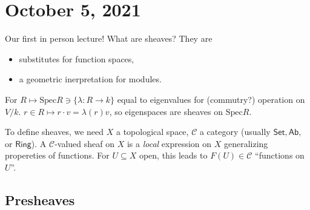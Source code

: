\section{October 5, 2021} 
Our first in person lecture! What are sheaves? They are 
\begin{itemize}
\setlength\itemsep{-.2em}
    \item substitutes for function spaces,
    \item a geometric inerpretation for modules.
\end{itemize}
For $R \mapsto \mathrm{Spec}R \ni \{\lambda \colon R \to k\} $ equal to  eigenvalues for (commutry?) operation on $V / k$. $r \in R \mapsto  r \cdot v = \lambda(r) v$, so eigenspaces are sheaves on $\mathrm{Spec}R$.

To define sheaves, we need $X$ a topological space, $\mathcal{C} $ a category (usually $\mathsf{Set} , \mathsf{Ab} , $ or $\mathsf{Ring} $). A $\mathcal{C} $-valued sheaf on $X$ is a \emph{local} expression on $X$ generalizing propereties of functions. For $U \subseteq X$ open, this leads to $F(U) \in  \mathcal{C} $ ``functions on $U$''.

\subsection{Presheaves}


